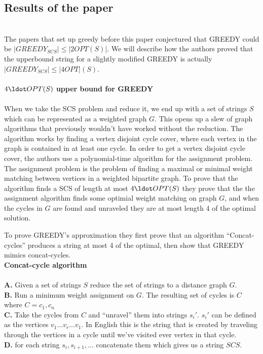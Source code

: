 \documentclass[letterpaper,11pt,titlepage]{article}
\begin{document}
\subsection*{Results of the paper}\\

The papers that set up greedy before this paper conjectured that GREEDY could be $ |GREEDY_{SCS}| \leq |2OPT(S)|$. We will describe how the authors proved that the upperbound string for a slightly modified GREEDY is actually $ |GREEDY_{SCS}| \leq |4OPT|(S)$.\\\\


\textbf{$4 \ldot OPT(S)$ upper bound for GREEDY}\\\\

When we take the SCS problem and reduce it, we end up with a set of strings $S$ which can be represented as a weighted graph $G$. This opens up a slew of graph algorithms that previously wouldn't have worked without the reduction. The algorithm works by finding a vertex disjoint cycle cover, where each vertex in the graph is contained in at least one cycle. In order to get a vertex disjoint cycle cover, the authors use a polynomial-time algorithm for the assignment problem. The assignment problem is the problem of finding a maximal or minimal weight matching between vertices in a weighted bipartite graph. To prove that the algorithm finds a SCS of length at most $4 \ldot OPT(S)$ they prove that the the assignment algorithm finds some optimial weight matching on graph $G$, and when the cycles in $G$ are found and unraveled they are at most length 4 of the optimal solution.

To prove GREEDY's approximation they first prove that an algorithm ``Concat-cycles'' produces a string at most 4 of the optimal, then show that GREEDY mimics concat-cycles.\\

\textbf{Concat-cycle algorithm}\\\\

\textbf{A.} Given a set of strings $S$ reduce the set of strings to a distance graph $G$. \\
\textbf{B.} Run a minimum weight assignment on $G$. The resulting set of cycles is $C$ where $C = {c_1, c_n}$\\
\textbf{C.} Take the cycles from $C$ and ``unravel'' them into strings $s_i'$. $s_i'$ can be defined as the vertices $v_1 ... v_r ... v_1$. In English this is the string that is created by traveling through the vertices in a cycle until we've visited ever vertex in that cycle.\\
\textbf{D.} for each string $s_i, s_{i+1}, ...$ concatenate them which gives us a string $SCS$.\\
\end{document}

